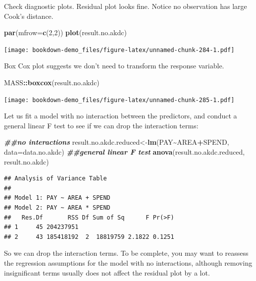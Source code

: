 \documentclass[
]{book}
\newenvironment{Shaded}{\begin{snugshade}}{\end{snugshade}}
\newcommand{\AttributeTok}[1]{\textcolor[rgb]{0.13,0.29,0.53}{#1}}
\newcommand{\DecValTok}[1]{\textcolor[rgb]{0.00,0.00,0.81}{#1}}
\newcommand{\DocumentationTok}[1]{\textcolor[rgb]{0.56,0.35,0.01}{\textbf{\textit{#1}}}}
\newcommand{\FunctionTok}[1]{\textcolor[rgb]{0.13,0.29,0.53}{\textbf{#1}}}
\newcommand{\NormalTok}[1]{#1}
\newcommand{\OtherTok}[1]{\textcolor[rgb]{0.56,0.35,0.01}{#1}}
\newcommand{\SpecialCharTok}[1]{\textcolor[rgb]{0.81,0.36,0.00}{\textbf{#1}}}
\begin{document}
Check diagnostic plots. Residual plot looks fine. Notice no observation has large Cook's distance.

\begin{Shaded}
\begin{Highlighting}[]
\FunctionTok{par}\NormalTok{(}\AttributeTok{mfrow=}\FunctionTok{c}\NormalTok{(}\DecValTok{2}\NormalTok{,}\DecValTok{2}\NormalTok{))}
\FunctionTok{plot}\NormalTok{(result.no.akdc)}
\end{Highlighting}
\end{Shaded}

\texttt{[image: bookdown-demo\_files/figure-latex/unnamed-chunk-284-1.pdf]}

Box Cox plot suggests we don't need to transform the response variable.

\begin{Shaded}
\begin{Highlighting}[]
\NormalTok{MASS}\SpecialCharTok{::}\FunctionTok{boxcox}\NormalTok{(result.no.akdc)}
\end{Highlighting}
\end{Shaded}

\texttt{[image: bookdown-demo\_files/figure-latex/unnamed-chunk-285-1.pdf]}

Let us fit a model with no interaction between the predictors, and conduct a general linear F test to see if we can drop the interaction terms:

\begin{Shaded}
\begin{Highlighting}[]
\DocumentationTok{\#\#no interactions}
\NormalTok{result.no.akdc.reduced}\OtherTok{\textless{}{-}}\FunctionTok{lm}\NormalTok{(PAY}\SpecialCharTok{\textasciitilde{}}\NormalTok{AREA}\SpecialCharTok{+}\NormalTok{SPEND, }\AttributeTok{data=}\NormalTok{data.no.akdc)}
\DocumentationTok{\#\#general linear F test}
\FunctionTok{anova}\NormalTok{(result.no.akdc.reduced, result.no.akdc)}
\end{Highlighting}
\end{Shaded}

\begin{verbatim}
## Analysis of Variance Table
## 
## Model 1: PAY ~ AREA + SPEND
## Model 2: PAY ~ AREA * SPEND
##   Res.Df       RSS Df Sum of Sq      F Pr(>F)
## 1     45 204237951                           
## 2     43 185418192  2  18819759 2.1822 0.1251
\end{verbatim}

So we can drop the interaction terms. To be complete, you may want to reassess the regression assumptions for the model with no interactions, although removing insignificant terms usually does not affect the residual plot by a lot.
\end{document}

